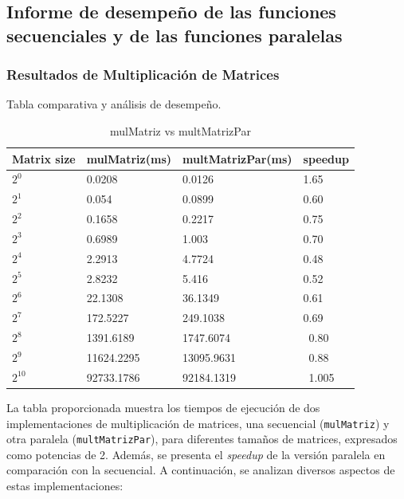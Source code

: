 \documentclass[12pt, a4paper]{article}
\begin{document}
\subsection{Informe de desempeño de las funciones secuenciales y de las funciones paralelas}
\subsubsection{Resultados de Multiplicación de Matrices}
Tabla comparativa y análisis de desempeño.

\begin{table}[h]
    \centering
    \begin{tabular}{ | m{2cm} | m{3cm} | m{4cm} | m{3cm} | }
    \hline
    Matrix size & mulMatriz(ms) & multMatrizPar(ms) & speedup \\ 
    \hline
    $2^0$ & 0.0208 & 0.0126 & 1.65 \\
    $2^1$ & 0.054 & 0.0899 & 0.60 \\
    $2^2$ & 0.1658 & 0.2217 & 0.75 \\
    $2^3$ & 0.6989 & 1.003 & 0.70 \\
    $2^4$ & 2.2913 & 4.7724 & 0.48 \\
    $2^5$ & 2.8232 & 5.416 & 0.52 \\
    $2^6$ & 22.1308 & 36.1349 & 0.61 \\
    $2^7$ & 172.5227 & 249.1038 & 0.69 \\
    $2^8$ & 1391.6189 & 1747.6074 & 0.80 \\
    $2^9$ & 11624.2295 & 13095.9631 & 0.88 \\
    $2^{10}$ & 92733.1786 & 92184.1319 & 1.005 \\
    \hline
    \end{tabular}
    \caption{mulMatriz vs multMatrizPar}
    \label{table:matrix_performance}
\end{table}
La tabla proporcionada muestra los tiempos de ejecución de dos implementaciones de multiplicación de matrices, una secuencial (\texttt{mulMatriz}) y otra paralela (\texttt{multMatrizPar}), para diferentes tamaños de matrices, expresados como potencias de 2. Además, se presenta el \textit{speedup} de la versión paralela en comparación con la secuencial. A continuación, se analizan diversos aspectos de estas implementaciones:
\end{document}
